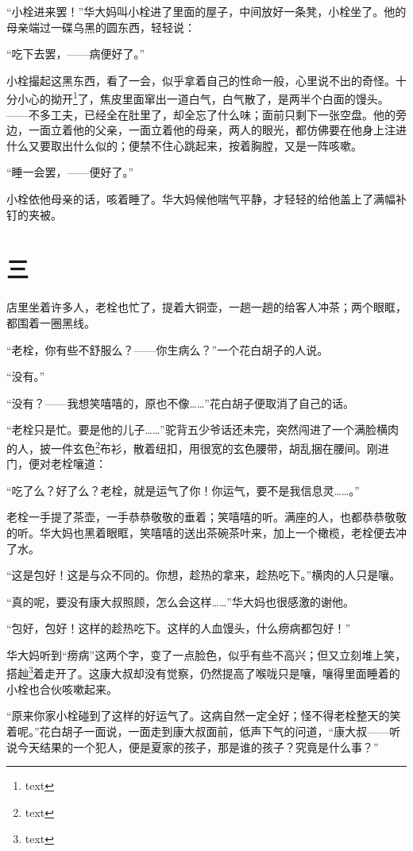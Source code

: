 \documentclass[12pt,UTF8]{ctexbook}
\begin{document}
“小栓进来罢！”华大妈叫小栓进了里面的屋子，中间放好一条凳，小栓坐了。他的母亲端过一碟乌黑的圆东西，轻轻说：

“吃下去罢，——病便好了。”

小栓撮起这黑东西，看了一会，似乎拿着自己的性命一般，心里说不出的奇怪。十分小心的拗开\footnote{text}了，焦皮里面窜出一道白气，白气散了，是两半个白面的馒头。——不多工夫，已经全在肚里了，却全忘了什么味；面前只剩下一张空盘。他的旁边，一面立着他的父亲，一面立着他的母亲，两人的眼光，都仿佛要在他身上注进什么又要取出什么似的；便禁不住心跳起来，按着胸膛，又是一阵咳嗽。

“睡一会罢，——便好了。”

小栓依他母亲的话，咳着睡了。华大妈候他喘气平静，才轻轻的给他盖上了满幅补钉的夹被。

\chapter{三}

店里坐着许多人，老栓也忙了，提着大铜壶，一趟一趟的给客人冲茶；两个眼眶，都围着一圈黑线。

“老栓，你有些不舒服么？——你生病么？”一个花白胡子的人说。

“没有。”

“没有？——我想笑嘻嘻的，原也不像……”花白胡子便取消了自己的话。

“老栓只是忙。要是他的儿子……”驼背五少爷话还未完，突然闯进了一个满脸横肉的人，披一件玄色\footnote{text}布衫，散着纽扣，用很宽的玄色腰带，胡乱捆在腰间。刚进门，便对老栓嚷道：

“吃了么？好了么？老栓，就是运气了你！你运气，要不是我信息灵……。”

老栓一手提了茶壶，一手恭恭敬敬的垂着；笑嘻嘻的听。满座的人，也都恭恭敬敬的听。华大妈也黑着眼眶，笑嘻嘻的送出茶碗茶叶来，加上一个橄榄，老栓便去冲了水。

“这是包好！这是与众不同的。你想，趁热的拿来，趁热吃下。”横肉的人只是嚷。

“真的呢，要没有康大叔照顾，怎么会这样……”华大妈也很感激的谢他。

“包好，包好！这样的趁热吃下。这样的人血馒头，什么痨病都包好！”

华大妈听到“痨病”这两个字，变了一点脸色，似乎有些不高兴；但又立刻堆上笑，搭赸\footnote{text}着走开了。这康大叔却没有觉察，仍然提高了喉咙只是嚷，嚷得里面睡着的小栓也合伙咳嗽起来。

“原来你家小栓碰到了这样的好运气了。这病自然一定全好；怪不得老栓整天的笑着呢。”花白胡子一面说，一面走到康大叔面前，低声下气的问道，“康大叔——听说今天结果的一个犯人，便是夏家的孩子，那是谁的孩子？究竟是什么事？”
\end{document}
